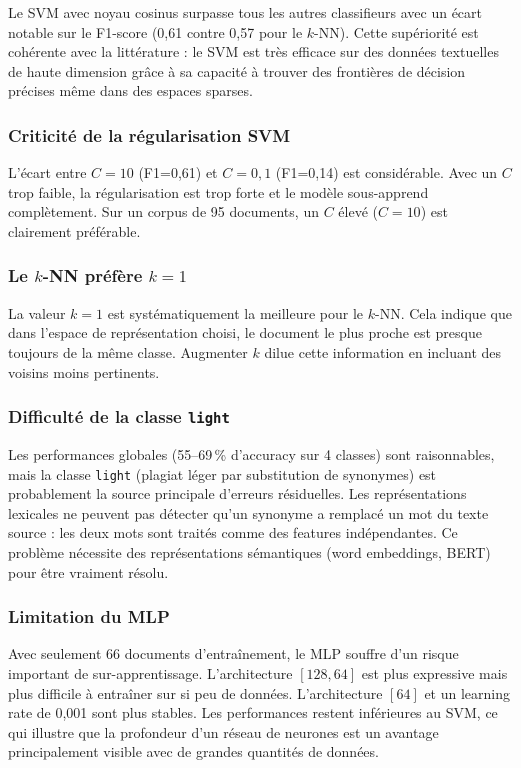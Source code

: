 \documentclass[12pt,a4paper]{article}
\begin{document}
Le SVM avec noyau cosinus surpasse tous les autres classifieurs avec un écart notable sur le F1-score (0,61 contre 0,57 pour le $k$-NN). Cette supériorité est cohérente avec la littérature : le SVM est très efficace sur des données textuelles de haute dimension grâce à sa capacité à trouver des frontières de décision précises même dans des espaces sparses.

\subsubsection{Criticité de la régularisation SVM}

L'écart entre $C=10$ (F1=0,61) et $C=0,1$ (F1=0,14) est considérable. Avec un $C$ trop faible, la régularisation est trop forte et le modèle sous-apprend complètement. Sur un corpus de 95 documents, un $C$ élevé ($C=10$) est clairement préférable.

\subsubsection{Le $k$-NN préfère $k=1$}

La valeur $k=1$ est systématiquement la meilleure pour le $k$-NN. Cela indique que dans l'espace de représentation choisi, le document le plus proche est presque toujours de la même classe. Augmenter $k$ dilue cette information en incluant des voisins moins pertinents.

\subsubsection{Difficulté de la classe \texttt{light}}

Les performances globales (55--69\,\% d'accuracy sur 4 classes) sont raisonnables, mais la classe \texttt{light} (plagiat léger par substitution de synonymes) est probablement la source principale d'erreurs résiduelles. Les représentations lexicales ne peuvent pas détecter qu'un synonyme a remplacé un mot du texte source : les deux mots sont traités comme des features indépendantes. Ce problème nécessite des représentations sémantiques (word embeddings, BERT) pour être vraiment résolu.

\subsubsection{Limitation du MLP}

Avec seulement 66 documents d'entraînement, le MLP souffre d'un risque important de sur-apprentissage. L'architecture $[128, 64]$ est plus expressive mais plus difficile à entraîner sur si peu de données. L'architecture $[64]$ et un learning rate de 0,001 sont plus stables. Les performances restent inférieures au SVM, ce qui illustre que la profondeur d'un réseau de neurones est un avantage principalement visible avec de grandes quantités de données.
\end{document}
